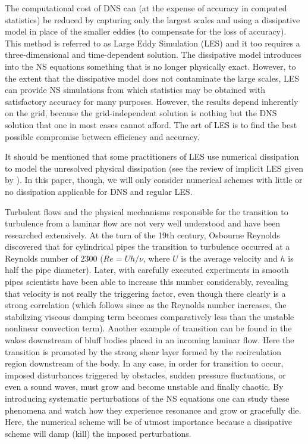 The computational cost of DNS can (at the expense of accuracy in
computed statistics) be reduced by capturing only the largest scales
and using a dissipative model in place of the smaller eddies (to
compensate for the loss of accuracy). This method is referred to as
Large Eddy Simulation (LES) and it too requires a three-dimensional and
time-dependent solution. The dissipative model introduces into the NS
equations something that is no longer physically exact. However, to the
extent that the dissipative model does not contaminate the large scales,
LES can provide NS simulations from which statistics may be obtained
with satisfactory accuracy for many purposes. However, the results depend
inherently on the grid, because the grid-independent solution is nothing
but the DNS solution that one in most cases cannot afford. The art of LES
is to find the best possible compromise between efficiency and accuracy.

It should be mentioned that some practitioners of LES use numerical
dissipation to model the unresolved physical dissipation (see the review
of implicit LES given by \citet{Iles}). In this paper, though, we will
only consider numerical schemes with little or no dissipation applicable
for DNS and regular LES.

Turbulent flows and the physical mechanisms responsible for the transition
to turbulence from a laminar flow are not very well understood and
have been researched extensively. At the turn of the 19th century,
Osbourne Reynolds discovered that for cylindrical pipes the transition to
turbulence occurred at a Reynolds number of 2300 ($Re = Uh/\nu$, where
$U$ is the average velocity and $h$ is half the pipe diameter). Later,
with carefully executed experiments in smooth pipes scientists have been
able to increase this number considerably, revealing that velocity is
not really the triggering factor, even though there clearly is a strong
correlation (which follows since as the Reynolds number increases, the
stabilizing viscous damping term becomes comparatively less than the
unstable nonlinear convection term). Another example of transition can
be found in the wakes downstream of bluff bodies placed in an incoming
laminar flow. Here the transition is promoted by the strong shear layer
formed by the recirculation region downstream of the body. In any case,
in order for transition to occur, imposed disturbances triggered by
obstacles, sudden pressure fluctuations, or even a sound waves, must
grow and become unstable and finally chaotic. By introducing systematic
perturbations of the NS equations one can study these phenomena and
watch how they experience resonance and grow or gracefully die. Here,
the numerical scheme will be of utmost importance because a dissipative
scheme will damp (kill) the imposed perturbations.

